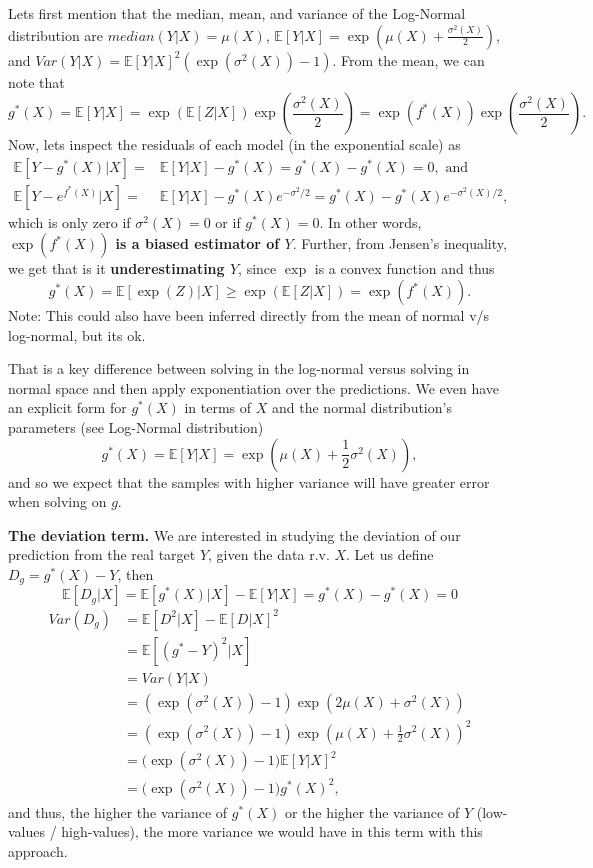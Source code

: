 \documentclass[11pt]{article}
\theoremstyle{plain}
\theoremstyle{definition}
\newcommand{\1}{\mathbf{1}}
\newcommand{\Expected}[1]{\mathbb{E}[#1]}
\begin{document}
Lets first mention that the median, mean, and variance of the Log-Normal distribution are $median(Y|X)=\mu(X)$, $\Expected{Y|X}=\exp{(\mu(X) + \frac{\sigma^2(X)}{2})}$, and $Var(Y|X)=\Expected{Y|X}^2(\exp{(\sigma^2(X))-1})$. From the mean, we can note that $$g^*(X)=\Expected{Y|X}=\exp{(\Expected{Z|X})} \exp{(\frac{\sigma^2(X)}{2})}=\exp{(f^*(X))} \exp{(\frac{\sigma^2(X)}{2})}.$$
Now, lets inspect the residuals of each model (in the exponential scale) as
\begin{align*}
    \Expected{Y - g^*(X)|X} =& \Expected{Y|X} - g^*(X) = g^*(X)- g^*(X) = 0, \text{ and}\\
    \Expected{Y - e^{f^*(X)}|X} =& \Expected{Y|X} - g^*(X)e^{-\sigma^2/2} = g^*(X)- g^*(X)e^{-\sigma^2(X)/2},
\end{align*}
which is only zero if $\sigma^2(X)=0$ or if $g^*(X)=0$. In other words, \textbf{$\exp{(f^*(X))}$ is a biased estimator of $Y$}. Further, from Jensen's inequality, we get that is it \textbf{underestimating $Y$}, since $\exp$ is a convex function and thus $$g^*(X)= \Expected{\exp{(Z)} | X}\geq \exp{(\Expected{Z | X})} = \exp{(f^*(X))}.$$ 
{\color{red} Note: This could also have been inferred directly from the mean of normal v/s log-normal, but its ok.}
 
 That is a key difference between solving in the log-normal versus solving in normal space and then apply exponentiation over the predictions. We even have an explicit form for $g^*(X)$ in terms of $X$ and the normal distribution's parameters (see Log-Normal distribution)
 $$g^*(X) = \Expected{Y|X} = \exp{\left(\mu(X) + \frac{1}{2}\sigma^2(X)\right)},$$
and so we expect that the samples with higher variance will have greater error when solving on $g$. 

\noindent \textbf{The deviation term.} 
We are interested in studying the deviation of our prediction from the real target $Y$, given the data r.v. $X$. Let us define $D_g=g^*(X)-Y$, then $$\Expected{D_g|X}=\Expected{g^*(X)|X}- \Expected{Y|X} = g^*(X)-g^*(X)=0$$
\begin{align*}
    Var(D_g) &= \Expected{D^2|X} - \Expected{D|X}^2 \\&=  \Expected{(g^* - Y)^2|X}\\&= Var(Y|X)\\ &=(\exp{(\sigma^2(X))} - 1 )\exp{\left(2 \mu(X) + \sigma^2(X)\right)}\\ &= (\exp{(\sigma^2(X))} - 1 )\exp{\left(\mu(X) + \frac{1}{2}\sigma^2(X)\right)}^2\\&=(\exp{(\sigma^2(X)) -1 )\Expected{Y|X}^2 }
    \\&=(\exp{(\sigma^2(X)) -1 )g^*(X)^2 },
\end{align*} 
and thus, the higher the variance of $g^*(X)$ or the higher the variance of $Y$ (low-values / high-values), the more variance we would have in this term with this approach.
\end{document}
